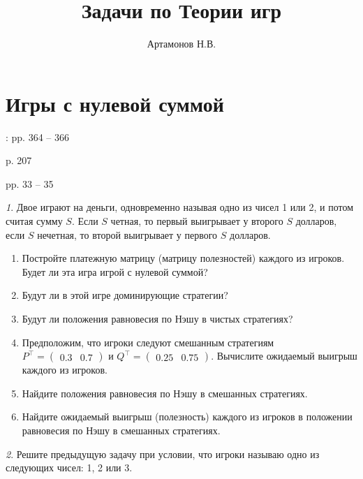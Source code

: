 \documentclass[12pt]{article}
\title{Задачи по Теории игр}
\author{Артамонов Н.В.}
\theoremstyle{remark}
\newtheorem{exercise}{}[subsection]
\begin{document}
\maketitle

\tableofcontents

\section{Игры с нулевой суммой}

\cite{Asoke}: pp. 364 -- 366

\noindent\cite{Eichhorn} p. 207

\noindent\cite{Peters} pp. 33 -- 35


\begin{exercise}%
Двое играют на деньги, одновременно называя одно из чисел 1 или 2, 
и потом считая сумму $S$. Если $S$ четная, то первый выигрывает у второго $S$ долларов,
если $S$ нечетная, то второй выигрывает у первого $S$ долларов. 
\begin{enumerate}
	\item Постройте платежную матрицу (матрицу полезностей) каждого из игроков. 
	Будет ли эта игра игрой с нулевой суммой? %
	\item Будут ли в этой игре доминирующие стратегии? %
	\item Будут ли положения равновесия по Нэшу в чистых стратегиях? %
	\item Предположим, что игроки следуют смешанным стратегиям 
	\(P^\top=\begin{pmatrix} 0.3 & 0.7\end{pmatrix}\) и \(Q^\top=\begin{pmatrix} 0.25 & 0.75\end{pmatrix}\).
	Вычислите ожидаемый выигрыш каждого из игроков.
	\item Найдите положения равновесия по Нэшу в смешанных стратегиях.
	\item Найдите ожидаемый выигрыш (полезность) каждого из игроков
	в положении равновесия по Нэшу в смешанных стратегиях.
\end{enumerate}
\end{exercise}

\begin{exercise}
Решите предыдущую задачу при условии, что игроки называю одно из 
следующих чисел: 1, 2 или 3.
\end{exercise}
\end{document}
